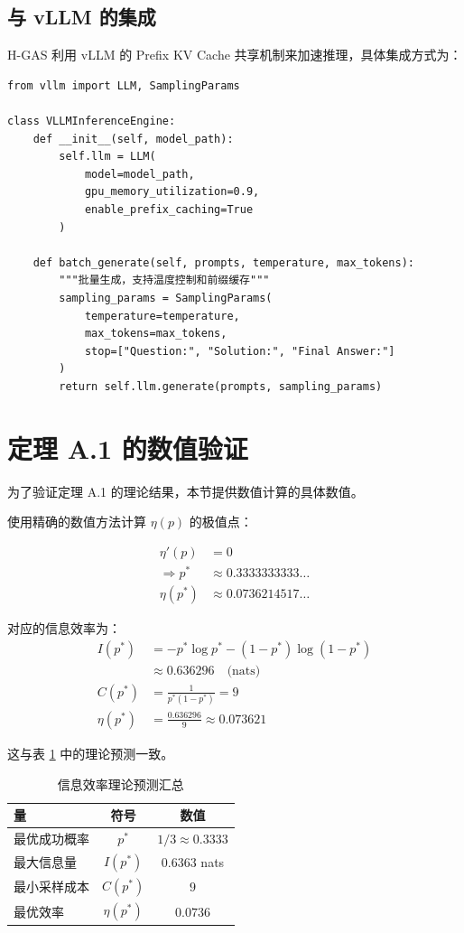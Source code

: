 \subsection{与 vLLM 的集成}

H-GAS 利用 vLLM 的 Prefix KV Cache 共享机制来加速推理，具体集成方式为：

\begin{verbatim}
from vllm import LLM, SamplingParams

class VLLMInferenceEngine:
    def __init__(self, model_path):
        self.llm = LLM(
            model=model_path,
            gpu_memory_utilization=0.9,
            enable_prefix_caching=True
        )

    def batch_generate(self, prompts, temperature, max_tokens):
        """批量生成，支持温度控制和前缀缓存"""
        sampling_params = SamplingParams(
            temperature=temperature,
            max_tokens=max_tokens,
            stop=["Question:", "Solution:", "Final Answer:"]
        )
        return self.llm.generate(prompts, sampling_params)
\end{verbatim}

\section{定理 A.1 的数值验证}
\label{sec:appendix_numerical}

为了验证定理 A.1 的理论结果，本节提供数值计算的具体数值。

使用精确的数值方法计算 $\eta(p)$ 的极值点：

\begin{align*}
\eta'(p) &= 0 \\
\Rightarrow p^* &\approx 0.3333333333\ldots \\
\eta(p^*) &\approx 0.0736214517\ldots
\end{align*}

对应的信息效率为：
\begin{align*}
I(p^*) &= -p^* \log p^* - (1-p^*) \log (1-p^*) \\
       &\approx 0.636296  \quad \text{(nats)} \\
C(p^*) &= \frac{1}{p^*(1-p^*)} = 9 \\
\eta(p^*) &= \frac{0.636296}{9} \approx 0.073621
\end{align*}

这与表 \ref{tab:theory_summary} 中的理论预测一致。

\begin{table}[htbp]
    \centering
    \caption{信息效率理论预测汇总}\label{tab:theory_summary}
    \begin{tabular}{l|c|c}
    \hline
    \textbf{量} & \textbf{符号} & \textbf{数值} \\
    \hline
    最优成功概率 & $p^*$ & $1/3 \approx 0.3333$ \\
    最大信息量 & $I(p^*)$ & $0.6363$ nats \\
    最小采样成本 & $C(p^*)$ & $9$ \\
    最优效率 & $\eta(p^*)$ & $0.0736$ \\
    \hline
    \end{tabular}
\end{table}